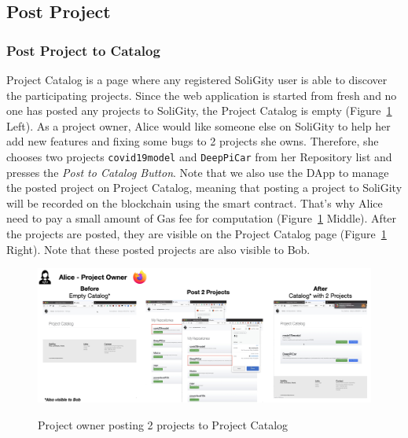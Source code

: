 \documentclass[12pt]{article}
\renewcommand{\_}{\kern-1.5pt\textunderscore\kern-1.5pt}
\begin{document}
\subsection{Post Project}
\subsubsection{Post Project to Catalog}
Project Catalog is a page where any registered SoliGity user is able to discover the participating projects. Since the web application is started from fresh and no one has posted any projects to SoliGity, the Project Catalog is empty (Figure~\ref{fig:post1} Left). As a project owner, Alice would like someone else on SoliGity to help her add new features and fixing some bugs to 2 projects she owns. Therefore, she chooses two projects \texttt{covid19model} and \texttt{DeepPiCar} from her Repository list and presses the \textit{Post to Catalog Button}. Note that we also use the DApp to manage the posted project on Project Catalog, meaning that posting a project to SoliGity will be recorded on the blockchain using the smart contract. That's why Alice need to pay a small amount of Gas fee for computation (Figure~\ref{fig:post1} Middle). After the projects are posted, they are visible on the Project Catalog page (Figure~\ref{fig:post1} Right). Note that these posted projects are also visible to Bob.
\begin{figure}[H]
	\centering
	\includegraphics[width=16.5cm]{graphs/50. post_1.png}\\
	\caption{Project owner posting 2 projects to Project Catalog}
	\label{fig:post1}
\end{figure}
\end{document}
